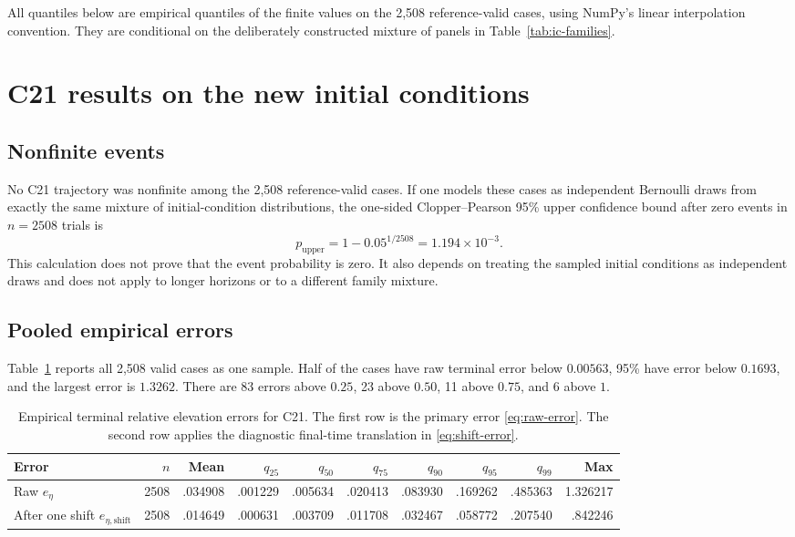 \documentclass[11pt]{article}
\newcommand{\eref}{e_{\eta}}
\newcommand{\eshift}{e_{\eta,\mathrm{shift}}}
\begin{document}
All quantiles below are empirical quantiles of the finite values on the 2,508
reference-valid cases, using NumPy's linear interpolation convention.  They
are conditional on the deliberately constructed mixture of panels in
Table~\ref{tab:ic-families}.

\section{C21 results on the new initial conditions}

\subsection{Nonfinite events}

No C21 trajectory was nonfinite among the 2,508 reference-valid cases.  If one
models these cases as independent Bernoulli draws from exactly the same
mixture of initial-condition distributions, the one-sided Clopper--Pearson
95\% upper confidence bound after zero events in $n=2508$ trials is
\begin{equation}
  p_{\mathrm{upper}}=1-0.05^{1/2508}=1.194\times10^{-3}.
  \label{eq:zero-upper}
\end{equation}
This calculation does not prove that the event probability is zero.  It also
depends on treating the sampled initial conditions as independent draws and
does not apply to longer horizons or to a different family mixture.

\subsection{Pooled empirical errors}

Table~\ref{tab:pooled} reports all 2,508 valid cases as one sample.  Half of
the cases have raw terminal error below $0.00563$, 95\% have error below
$0.1693$, and the largest error is $1.3262$.  There are 83 errors above
$0.25$, 23 above $0.50$, 11 above $0.75$, and 6 above $1$.

\begin{table}[htbp]
\centering
\small
\setlength{\tabcolsep}{4pt}
\begin{tabular}{lrrrrrrrrr}
\toprule
Error & $n$ & Mean & $q_{25}$ & $q_{50}$ & $q_{75}$ & $q_{90}$ & $q_{95}$ & $q_{99}$ & Max \\
\midrule
Raw $\eref$
& 2508 & .034908 & .001229 & .005634 & .020413 & .083930 & .169262 & .485363 & 1.326217 \\
After one shift $\eshift$
& 2508 & .014649 & .000631 & .003709 & .011708 & .032467 & .058772 & .207540 & .842246 \\
\bottomrule
\end{tabular}
\caption{Empirical terminal relative elevation errors for C21.  The first row
is the primary error \eqref{eq:raw-error}.  The second row applies the
diagnostic final-time translation in \eqref{eq:shift-error}.}
\label{tab:pooled}
\end{table}
\end{document}
